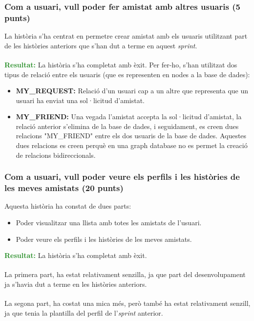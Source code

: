\documentclass[11pt,catalan,listoffigures,listoftables]{tfgetsinf}
\begin{document}
\subsubsection{Com a usuari, vull poder fer amistat amb altres usuaris (5 punts)}
La història s'ha centrat en permetre crear amistat amb els usuaris utilitzant part de les històries anteriors que s'han dut a terme en aquest \textit{sprint}.\\ \\
\textcolor{forestgreen}{\textbf{Resultat:}} La història s'ha completat amb èxit. Per fer-ho, s'han utilitzat dos tipus de relació entre els usuaris (que es representen en nodes a la base de dades):
\begin{itemize}
\item \textbf{MY\_REQUEST:} Relació d'un usuari cap a un altre que representa que un usuari ha enviat una sol·licitud d'amistat.
\item \textbf{MY\_FRIEND:} Una vegada l'amistat accepta la sol·licitud d'amistat, la relació anterior s'elimina de la base de dades, i seguidament, es creen dues relacions "MY\_FRIEND" entre els dos usuaris de la base de dades. Aquestes dues relacions es creen perquè en una graph database no es permet la creació de relacions bidireccionals.
\end{itemize}

\subsubsection{Com a usuari, vull poder veure els perfils i les històries de les meves amistats (20 punts)}

Aquesta història ha constat de dues parts:
\begin{itemize}
\item Poder visualitzar una llista amb totes les amistats de l'usuari.
\item Poder veure els perfils i les històries de les meves amistats.
\end{itemize}
\textcolor{forestgreen}{\textbf{Resultat:}} La història s'ha completat amb èxit.\\ \\
La primera part, ha estat relativament senzilla, ja que part del desenvolupament ja s'havia dut a terme en les històries anteriors.\\ \\
La segona part, ha costat una mica més, però també ha estat relativament senzill, ja que tenia la plantilla del perfil de l'\textit{sprint} anterior.
\end{document}

